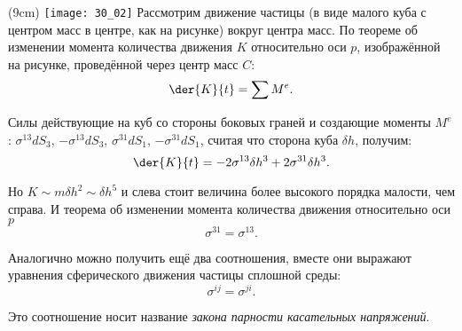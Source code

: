 \sidefig(9cm)
{\texttt{[image: 30\_02]}}{  
Рассмотрим движение частицы (в виде малого куба с центром масс в центре, как на
рисунке) вокруг центра масс. По теореме об изменении момента количества
движения \( K \) относительно оси \( p \), изображённой на рисунке, проведённой
через центр масс \( C \):
\[
    \der{K}{t} = \sum M^e.
\]
}

Силы действующие на куб со стороны боковых граней и создающие моменты \( M^e \):
\( \sigma^{13}dS_3 \), \( -\sigma^{13}dS_3 \), \( \sigma^{31}dS_1 \),
\( -\sigma^{31}dS_1 \), считая что сторона куба \( \delta h \), получим:
\[
    \der{K}{t} = -2\sigma^{13}\delta h^3+ 2\sigma^{31}\delta h^3.
\]

Но \(K \sim m \delta h^2 \sim \delta h^5\) и слева стоит величина более
высокого порядка малости, чем справа. И теорема об изменении момента количества
движения относительно оси \(p\)
\[
    \sigma^{31} = \sigma^{13}.
\]

Аналогично можно получить ещё два соотношения, вместе они выражают уравнения
сферического движения частицы сплошной среды:
\[
    \sigma^{ij} = \sigma^{ji}.
\]

Это соотношение носит название \emph{закона парности касательных напряжений}. 

\newpage
